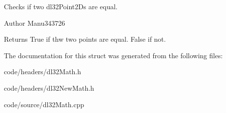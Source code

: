 Checks if two dl32\-Point2\-Ds are equal. 

\begin{DoxyAuthor}{Author}
Manu343726
\end{DoxyAuthor}
\begin{DoxyReturn}{Returns}
True if thw two points are equal. False if not. 
\end{DoxyReturn}


The documentation for this struct was generated from the following files\-:\begin{DoxyCompactItemize}
\item 
code/headers/dl32\-Math.\-h\item 
code/headers/dl32\-New\-Math.\-h\item 
code/source/dl32\-Math.\-cpp\end{DoxyCompactItemize}
